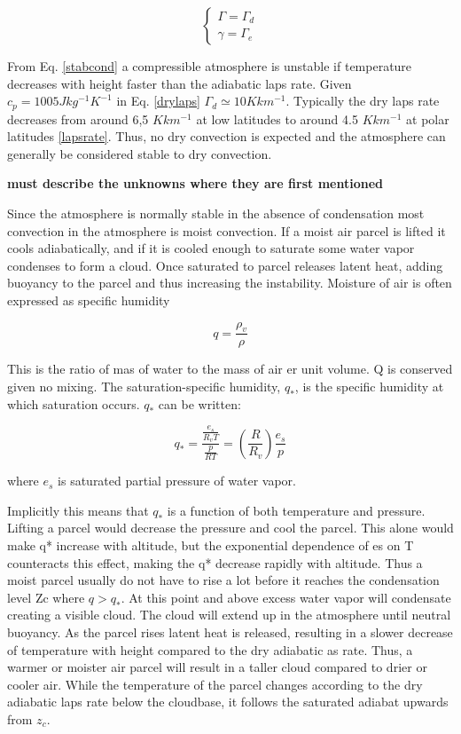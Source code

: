 \begin{equation}
    \begin{cases}
        \Gamma = \Gamma_d \\
        \gamma = \Gamma_e
    \end{cases}
\end{equation}

From Eq. \eqref{stabcond} a compressible atmosphere is unstable if temperature decreases with height faster than the adiabatic laps rate. Given $c_p = 1005 Jkg^{-1}K^{-1}$ in Eq. \eqref{drylaps} $\Gamma_d \simeq 10 K km^{-1}$. Typically the dry laps rate decreases from around 6,5 $K km^{-1}$ at low latitudes to around 4.5 $K km^{-1}$ at polar latitudes \ref{lapsrate}. Thus, no dry convection is expected and the atmosphere can generally be considered stable to dry convection.     

\textbf{must describe the unknowns where they are first mentioned}


Since the atmosphere is normally stable in the absence of condensation most convection in the atmosphere is moist convection. If a moist air parcel is lifted it cools adiabatically, and if it is cooled enough to saturate some water vapor condenses to form a cloud. Once saturated to parcel releases latent heat, adding buoyancy to the parcel and thus increasing the instability.
Moisture of air is often expressed as specific humidity 

\begin{equation}
    q = \frac{\rho_v}{\rho}
\end{equation}

This is the ratio of mas of water to the mass of air er unit volume. Q is conserved given no mixing. The saturation-specific humidity, $q_*$, is the specific humidity at which saturation occurs. $q_*$ can be written:

\begin{equation}
    q_* = \frac{\frac{e_s}{R_v T}}{\frac{p}{RT}} = \left(\frac{R}{R_v}\right)\frac{e_s}{p}
    \label{qnote}
\end{equation}

where $e_s$ is saturated partial pressure of water vapor. 

Implicitly this means that $q_*$ is a function of both temperature and pressure. Lifting a parcel would decrease the pressure and cool the parcel. This alone would make q* increase with altitude, but the exponential dependence of es on T counteracts this effect, making the q* decrease rapidly with altitude. Thus a moist parcel usually do not have to rise a lot before it reaches the condensation level Zc where $q>q_*$. At this point and above excess water vapor will condensate creating a visible cloud. The cloud will extend up in the atmosphere until neutral buoyancy. As the parcel rises latent heat is released, resulting in a slower decrease of temperature with height compared to the dry adiabatic as rate.  Thus, a warmer or moister air parcel will result in a taller cloud compared to drier or cooler air. While the temperature of the parcel changes according to the dry adiabatic laps rate below the cloudbase, it follows the saturated adiabat upwards from $z_c$. 

